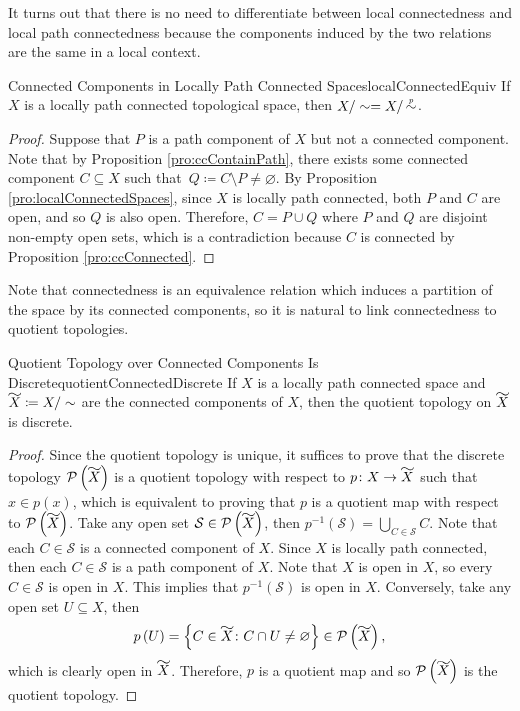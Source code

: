 \documentclass[math]{amznotes}
\renewcommand\widetilde[1]{\ThisStyle{%
  \setbox0=\hbox{$\SavedStyle#1$}%
  \stackengine{1pt-\LMpt}{$\SavedStyle#1$}{%
    \stretchto{\scaleto{\SavedStyle\mkern.2mu\sim}{.5467\wd0}}{.5\ht0}%
  }{O}{c}{F}{T}{S}%
}}
\theoremstyle{remark}
\newcommand{\psim}{\mathop{\mathrel{\accentset{p}{\sim}}}}
\begin{document}
It turns out that there is no need to differentiate between local connectedness and local path connectedness because the components induced by the two relations are the same in a local context.
\begin{probox}{Connected Components in Locally Path Connected Spaces}{localConnectedEquiv}
    If $X$ is a locally path connected topological space, then $X \slash \sim = X \slash \psim$.
    \tcblower
    \begin{proof}
        Suppose that $P$ is a path component of $X$ but not a connected component. Note that by Proposition \ref{pro:ccContainPath}, there exists some connected component $C \subseteq X$ such that~$Q \coloneqq C \setminus P \neq \varnothing$. By Proposition \ref{pro:localConnectedSpaces}, since $X$ is locally path connected, both $P$ and $C$ are open, and so $Q$ is also open. Therefore, $C = P \cup Q$ where $P$ and $Q$ are disjoint non-empty open sets, which is a contradiction because $C$ is connected by Proposition \ref{pro:ccConnected}. 
    \end{proof}
\end{probox}
Note that connectedness is an equivalence relation which induces a partition of the space by its connected components, so it is natural to link connectedness to quotient topologies.
\begin{probox}{Quotient Topology over Connected Components Is Discrete}{quotientConnectedDiscrete}
    If $X$ is a locally path connected space and $\widetilde{X} \coloneqq X \slash \sim$ are the connected components of $X$, then the quotient topology on $\widetilde{X}$ is discrete.
    \tcblower
    \begin{proof}
        Since the quotient topology is unique, it suffices to prove that the discrete topology $\mathcal{P}\left(\widetilde{X}\right)$ is a quotient topology with respect to $p \colon X \to \widetilde{X}$ such that $x \in p\left(x\right)$, which is equivalent to proving that $p$ is a quotient map with respect to $\mathcal{P}\left(\widetilde{X}\right)$. Take any open set $\mathcal{S} \in \mathcal{P}\left(\widetilde{X}\right)$, then $p^{-1}\left(\mathcal{S}\right) = \bigcup_{C \in \mathcal{S}}C$. Note that each $C \in \mathcal{S}$ is a connected component of $X$. Since $X$ is locally path connected, then each $C \in \mathcal{S}$ is a path component of $X$. Note that $X$ is open in $X$, so every $C \in \mathcal{S}$ is open in $X$. This implies that $p^{-1}\left(\mathcal{S}\right)$ is open in $X$. Conversely, take any open set $U \subseteq X$, then 
        \begin{equation*}
            p\left(U\right) = \left\{C \in \widetilde{X} \colon C \cap U \neq \varnothing\right\} \in \mathcal{P}\left(\widetilde{X}\right),
        \end{equation*}
        which is clearly open in $\widetilde{X}$. Therefore, $p$ is a quotient map and so $\mathcal{P}\left(\widetilde{X}\right)$ is the quotient topology.
    \end{proof}
\end{probox}
\end{document}
